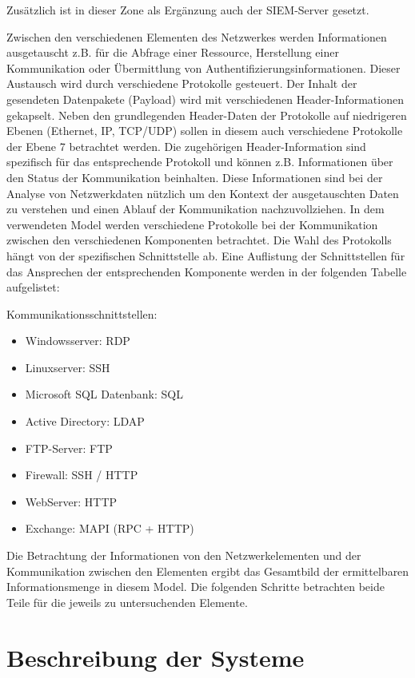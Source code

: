 Zusätzlich ist in dieser Zone als Ergänzung auch der SIEM-Server gesetzt.

Zwischen den verschiedenen Elementen des Netzwerkes werden Informationen ausgetauscht z.B. für die Abfrage einer Ressource, Herstellung einer Kommunikation oder Übermittlung von Authentifizierungsinformationen. Dieser Austausch wird durch verschiedene Protokolle gesteuert. Der Inhalt der gesendeten Datenpakete (Payload) wird mit verschiedenen Header-Informationen gekapselt. Neben den grundlegenden Header-Daten der Protokolle auf niedrigeren Ebenen (Ethernet, IP, TCP/UDP) sollen in diesem auch verschiedene Protokolle der Ebene 7 betrachtet werden. Die zugehörigen Header-Information sind spezifisch für das entsprechende Protokoll und können z.B. Informationen über den Status der Kommunikation beinhalten. Diese Informationen sind bei der Analyse von Netzwerkdaten nützlich um den Kontext der ausgetauschten Daten zu verstehen und einen Ablauf der Kommunikation nachzuvollziehen.
In dem verwendeten Model werden verschiedene Protokolle bei der Kommunikation zwischen den verschiedenen Komponenten betrachtet. Die Wahl des Protokolls hängt von der spezifischen Schnittstelle ab. Eine Auflistung der Schnittstellen für das Ansprechen der entsprechenden Komponente werden in der folgenden Tabelle aufgelistet:

Kommunikationsschnittstellen:
\begin{itemize}
\item Windowsserver: RDP
\item Linuxserver: SSH
\item Microsoft SQL Datenbank: SQL
\item Active Directory: LDAP
\item FTP-Server: FTP
\item Firewall: SSH / HTTP
\item WebServer: HTTP
\item Exchange: MAPI (RPC + HTTP)
\end{itemize}

Die Betrachtung der Informationen von den Netzwerkelementen und der Kommunikation zwischen den Elementen ergibt das Gesamtbild der ermittelbaren Informationsmenge in diesem Model. Die folgenden Schritte betrachten beide Teile für die jeweils zu untersuchenden Elemente.

\section{Beschreibung der Systeme}
